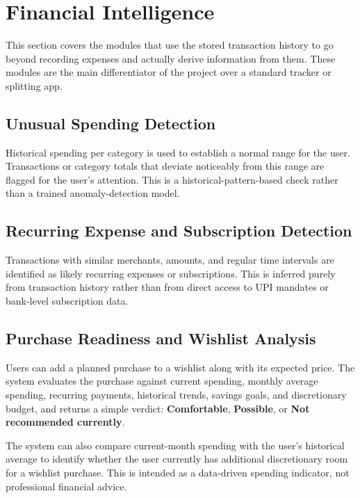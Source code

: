 \documentclass[11pt,a4paper]{article}
\begin{document}

\section{Financial Intelligence}

This section covers the modules that use the stored transaction history
to go beyond recording expenses and actually derive information from
them. These modules are the main differentiator of the project over a
standard tracker or splitting app.

\subsection{Unusual Spending Detection}

Historical spending per category is used to establish a normal range for
the user. Transactions or category totals that deviate noticeably from
this range are flagged for the user's attention. This is a
historical-pattern-based check rather than a trained anomaly-detection
model.

\subsection{Recurring Expense and Subscription Detection}

Transactions with similar merchants, amounts, and regular time intervals
are identified as likely recurring expenses or subscriptions. This is
inferred purely from transaction history rather than from direct access
to UPI mandates or bank-level subscription data.

\subsection{Purchase Readiness and Wishlist Analysis}

Users can add a planned purchase to a wishlist along with its expected
price. The system evaluates the purchase against current spending,
monthly average spending, recurring payments, historical trends, savings
goals, and discretionary budget, and returns a simple verdict:
\textbf{Comfortable}, \textbf{Possible}, or
\textbf{Not recommended currently}.

The system can also compare current-month spending with the user's
historical average to identify whether the user currently has additional
discretionary room for a wishlist purchase. This is intended as a
data-driven spending indicator, not professional financial advice.
\end{document}
